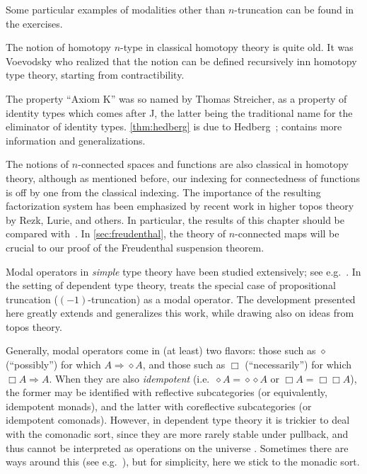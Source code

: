 Some particular examples of modalities other than $n$-truncation can be found in the exercises.


\sectionNotes

The notion of homotopy $n$-type in classical homotopy theory is quite old.
It was Voevodsky who realized that the notion can be defined recursively inn homotopy type theory, starting from contractibility.

%
The property ``Axiom K'' was so named by Thomas Streicher, as a property of identity types which comes after J, the latter being the traditional name for the eliminator of identity types.
\autoref{thm:hedberg} is due to Hedberg~\cite{hedberg1998coherence}; \cite{krausgeneralizations} contains more information and generalizations.

The notions of $n$-connected spaces and functions are also classical in homotopy theory, although as mentioned before, our indexing for connectedness of functions is off by one from the classical indexing.
The importance of the resulting factorization system has been emphasized by recent work in higher topos theory by Rezk, Lurie, and others.%
In particular, the results of this chapter should be compared with~\cite[\S6.5.1]{lurie:higher-topoi}.
In \autoref{sec:freudenthal}, the theory of $n$-connected maps will be crucial to our proof of the Freudenthal suspension theorem.

Modal operators in \emph{simple} type theory have been studied extensively; see e.g.~\cite{modalTT}.  In the setting of dependent type theory, \cite{ab:bracket-types} treats the special case of propositional truncation ($(-1)$-truncation) as a modal operator.  The development presented here greatly extends and generalizes this work, while drawing also on ideas from topos theory.

Generally, modal operators come in (at least) two flavors: those such as $\diamond$ (``possibly'') for which $A\Rightarrow \diamond A$, and those such as $\Box$ (``necessarily'') for which $\Box A \Rightarrow A$.
When they are also \emph{idempotent} (i.e.\ $\diamond A = \diamond{\diamond A}$ or $\Box A = \Box{\Box A}$), the former may be identified with reflective subcategories (or equivalently, idempotent monads), and the latter with coreflective subcategories (or idempotent comonads).
However, in dependent type theory it is trickier to deal with the comonadic sort, since they are more rarely stable under pullback, and thus cannot be interpreted as operations on the universe \UU.
Sometimes there are ways around this (see e.g.~\cite{QGFTinCHoTT12}), but for simplicity, here we stick to the monadic sort.

